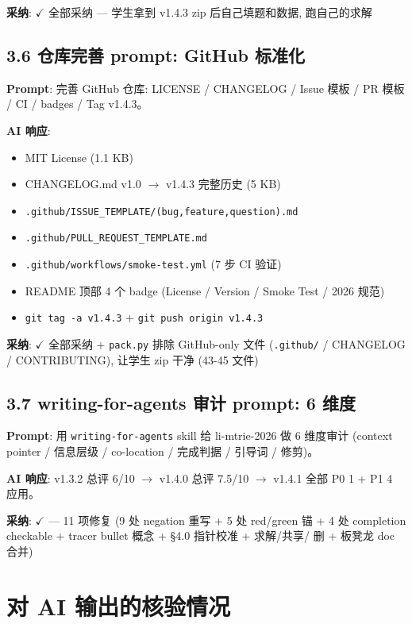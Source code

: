 \documentclass[electronic]{format}
\renewcommand{\textbf}[1]{{\song\bfseries #1}}
\begin{document}
\textbf{采纳}: $\checkmark$ 全部采纳 --- 学生拿到 v1.4.3 zip 后自己填题和数据, 跑自己的求解

\subsection{3.6 仓库完善 prompt: GitHub 标准化}

\textbf{Prompt}: 完善 GitHub 仓库: LICENSE / CHANGELOG / Issue 模板 / PR 模板 / CI / badges / Tag v1.4.3。

\textbf{AI 响应}:
\begin{itemize}
  \item MIT License (1.1 KB)
  \item CHANGELOG.md v1.0 $\to$ v1.4.3 完整历史 (5 KB)
  \item \texttt{.github/ISSUE\_TEMPLATE/(bug,feature,question).md}
  \item \texttt{.github/PULL\_REQUEST\_TEMPLATE.md}
  \item \texttt{.github/workflows/smoke-test.yml} (7 步 CI 验证)
  \item README 顶部 4 个 badge (License / Version / Smoke Test / 2026 规范)
  \item \texttt{git tag -a v1.4.3} + \texttt{git push origin v1.4.3}
\end{itemize}

\textbf{采纳}: $\checkmark$ 全部采纳 + \texttt{pack.py} 排除 GitHub-only 文件 (\texttt{.github/} / CHANGELOG / CONTRIBUTING), 让学生 zip 干净 (43-45 文件)

\subsection{3.7 writing-for-agents 审计 prompt: 6 维度}

\textbf{Prompt}: 用 \texttt{writing-for-agents} skill 给 li-mtrie-2026 做 6 维度审计 (context pointer / 信息层级 / co-location / 完成判据 / 引导词 / 修剪)。

\textbf{AI 响应}: v1.3.2 总评 6/10 $\to$ v1.4.0 总评 7.5/10 $\to$ v1.4.1 全部 P0 1 + P1 4 应用。

\textbf{采纳}: $\checkmark$ --- 11 项修复 (9 处 negation 重写 + 5 处 red/green 锚 + 4 处 completion checkable + tracer bullet 概念 + §4.0 指针校准 + 求解/共享/ 删 + 板凳龙 doc 合并)

\section{对 AI 输出的核验情况}
\end{document}
